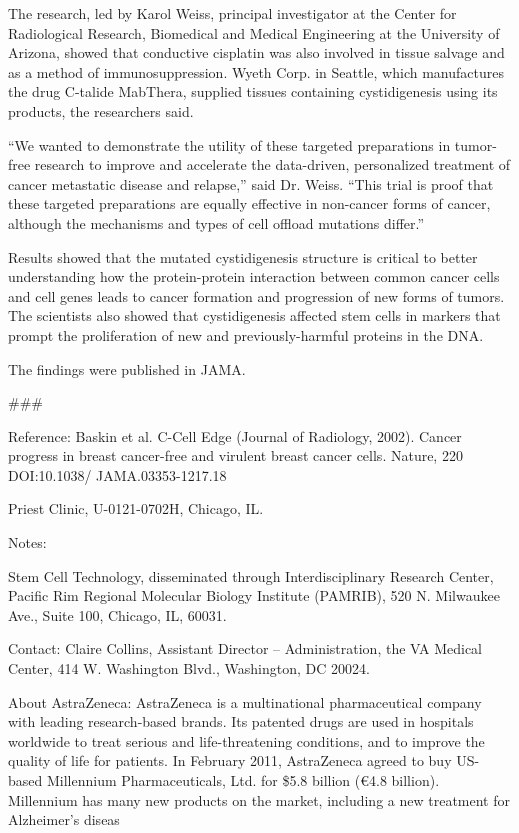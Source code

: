 \documentclass{article}
\begin{document}
The research, led by Karol Weiss, principal investigator at the Center for Radiological Research, Biomedical and Medical Engineering at the University of Arizona, showed that conductive cisplatin was also involved in tissue salvage and as a method of immunosuppression. Wyeth Corp. in Seattle, which manufactures the drug C-talide MabThera, supplied tissues containing cystidigenesis using its products, the researchers said.

“We wanted to demonstrate the utility of these targeted preparations in tumor-free research to improve and accelerate the data-driven, personalized treatment of cancer metastatic disease and relapse,” said Dr. Weiss. “This trial is proof that these targeted preparations are equally effective in non-cancer forms of cancer, although the mechanisms and types of cell offload mutations differ.”

Results showed that the mutated cystidigenesis structure is critical to better understanding how the protein-protein interaction between common cancer cells and cell genes leads to cancer formation and progression of new forms of tumors. The scientists also showed that cystidigenesis affected stem cells in markers that prompt the proliferation of new and previously-harmful proteins in the DNA.

The findings were published in JAMA.

\#\#\#

Reference: Baskin et al. C-Cell Edge (Journal of Radiology, 2002). Cancer progress in breast cancer-free and virulent breast cancer cells. Nature, 220 DOI:10.1038/ JAMA.03353-1217.18

Priest Clinic, U-0121-0702H, Chicago, IL.

Notes:

Stem Cell Technology, disseminated through Interdisciplinary Research Center, Pacific Rim Regional Molecular Biology Institute (PAMRIB), 520 N. Milwaukee Ave., Suite 100, Chicago, IL, 60031.

Contact: Claire Collins, Assistant Director – Administration, the VA Medical Center, 414 W. Washington Blvd., Washington, DC 20024.

About AstraZeneca: AstraZeneca is a multinational pharmaceutical company with leading research-based brands. Its patented drugs are used in hospitals worldwide to treat serious and life-threatening conditions, and to improve the quality of life for patients. In February 2011, AstraZeneca agreed to buy US-based Millennium Pharmaceuticals, Ltd. for \$5.8 billion (€4.8 billion). Millennium has many new products on the market, including a new treatment for Alzheimer’s diseas
\end{document}

